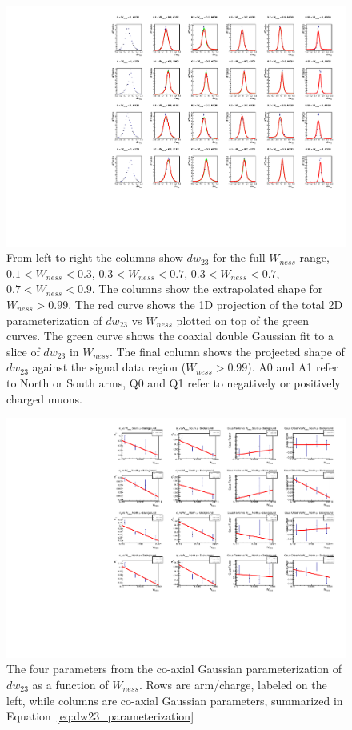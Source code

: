 \begin{figure}
  \centering
  \includegraphics[width=\linewidth]{./figures/dw23_extrap_bins.pdf}
  \caption{
    From left to right the columns show $dw_{23}$ for the full $W_{ness}$ range,
    $0.1 < W_{ness} < 0.3$, $0.3 < W_{ness} < 0.7$, $0.3 < W_{ness} < 0.7$, $0.7
    < W_{ness} < 0.9$. The columns show the extrapolated shape for $W_{ness} >
    0.99$. The red curve shows the 1D projection of the total 2D
    parameterization of $dw_{23}$ vs $W_{ness}$ plotted on top of the green
    curves. The green curve shows the coaxial double Gaussian fit to a slice of
    $dw_{23}$ in $W_{ness}$. The final column shows the projected shape of
    $dw_{23}$ against the signal data region ($W_{ness} > 0.99$). A0 and A1
    refer to North or South arms, Q0 and Q1 refer to negatively or positively
    charged muons.
  }
  \label{fig:dw23_slice_fits}
\end{figure}

\begin{figure}[ht]
  \centering
  \includegraphics[width=\linewidth]{./figures/dw23_parameters_linearized.pdf}
  \caption{
    The four parameters from the co-axial Gaussian parameterization of $dw_{23}$
    as a function of $W_{ness}$.  Rows are arm/charge, labeled on the left,
    while columns are co-axial Gaussian parameters, summarized in
    Equation~\ref{eq:dw23_parameterization}
  }
  \label{fig:coax_params_vs_wness}
\end{figure}


